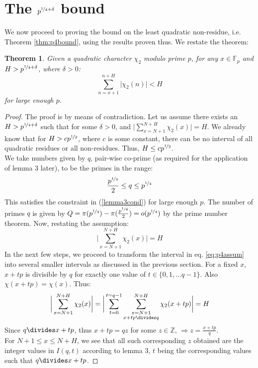 \documentclass{report}
\newtheorem*{theorem*}{Theorem}
\begin{document}
\section{The $p^{\nicefrac{1}{4}+\delta}$ bound}
We now proceed to proving the bound on the least quadratic non-residue, i.e. Theorem \ref{thm:p4bound}, using the results proven thus. We restate the theorem:
\begin{theorem*}
Given a quadratic character $\chi_2$ modulo prime $p$, for any $x\in\mathbb{F}_p$ and $H>p^{\nicefrac{1}{4}+\delta}$, where $\delta>0$:
\[\sum\limits_{n=x+1}^{n+H}\lvert\chi_2(n)\rvert<H\]
for large enough $p$.
\end{theorem*}
\begin{proof}
The proof is by means of contradiction. Let us assume there exists an $H>p^{\nicefrac{1}{4}+\delta}$ such that for some $\delta>0$, and $\Big \lvert \sum\limits_{x=N+1}^{N+H}\chi_2(x)\Big \rvert=H$. We already know that for $H>cp^{\nicefrac{1}{2}}$, where $c$ is some constant, there can be no interval of all quadratic residues or all non-residues. Thus, $H\leq cp^{\nicefrac{1}{2}}$.\\
We take numbers given by $q$, pair-wise co-prime (as required for the application of lemma 3 later), to be the primes in the range:
$$\frac{p^{\nicefrac{1}{4}}}{2} \leq q \leq p^{\nicefrac{1}{4}}$$
This satisfies the constraint in (\ref{lemma3cond}) for large enough $p$. The number of primes $q$ is given by $Q=\pi(p^{\nicefrac{1}{4}})-\pi(\frac{p^{\nicefrac{1}{4}}}{2})=o(p^{\nicefrac{1}{4}})$ by the prime number theorem. Now, restating the assumption:
\begin{equation} \label{eq:p4assum}
\bigg \lvert\sum\limits_{x=N+1}^{N+H}\chi_2(x)\bigg \rvert=H
\end{equation}
In the next few steps, we proceed to transform the interval in eq. \ref{eq:p4assum} into several smaller intervals as discussed in the previous section. For a fixed $x$, $x+tp$ is divisible by $q$ for exactly one value of $t\in\{0,1,...q-1\}$. Also $\chi(x+tp)=\chi(x)$. Thus:
\[
\bigg \lvert\sum\limits_{x=N+1}^{N+H}\chi_2(x)\bigg \rvert=\bigg \lvert\sum\limits_{t=0}^{t=q-1}\sum\limits_{\substack{x=N+1\\x+tp\divides q}}^{N+H}\chi_2(x+tp)\bigg \rvert=H
\]
Since $q\divides x+tp$, thus $x+tp=qz$ for some $z\in\mathbb{Z}$, $\Rightarrow z=\frac{x+tp}{q}$.\\
For $N+1\leq x \leq N+H$, we see that all such corresponding $z$ obtained are the integer values in $I(q,t)$ according to lemma 3, $t$ being the corresponding values such that $q \divides x+tp$.

\end{proof}
\end{document}
